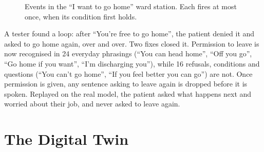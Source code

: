 \documentclass[journal]{IEEEtran}
\begin{document}
\begin{figure}[t]
\centering
{}
\caption{Events in the ``I want to go home'' ward station. Each fires at most once, when its condition first holds.}
\label{p2:fig:events}
\end{figure}

A tester found a loop: after ``You're free to go home'', the patient denied it and asked to go home again, over and over. Two fixes closed it.
Permission to leave is now recognised in 24 everyday phrasings (``You can head home'', ``Off you go'', ``Go home if you want'', ``I'm discharging
you''), while 16 refusals, conditions and questions (``You can't go home'', ``If you feel better you can go'') are not. Once permission is given,
any sentence asking to leave again is dropped before it is spoken. Replayed on the real model, the patient asked what happens next and worried
about their job, and never asked to leave again.


\section{The Digital Twin}\label{sec:model}
\end{document}
